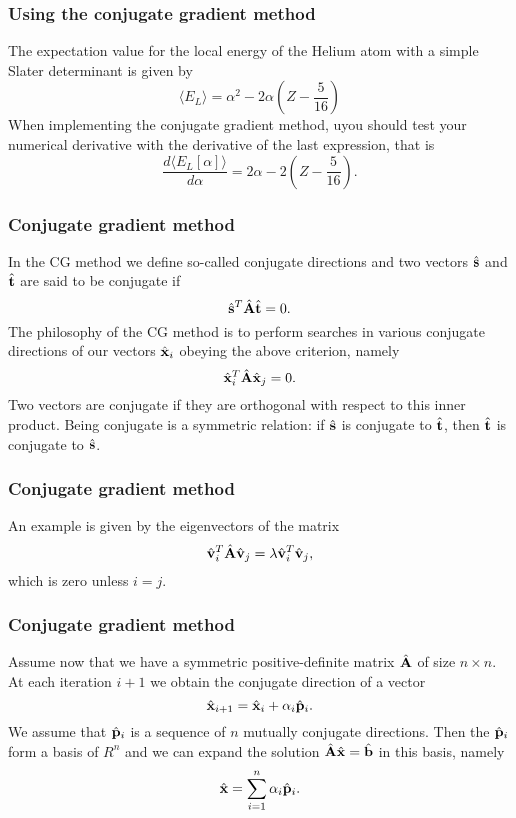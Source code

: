 \frame
{
  \frametitle{Using the conjugate gradient method}
\begin{small}
{\scriptsize
The expectation value for the local energy of the Helium atom with a simple Slater determinant is given by
\[
\langle E_{L} \rangle = \alpha^2-2\alpha\left(Z-\frac{5}{16}\right)
\]
When implementing the conjugate gradient method, uyou should test your numerical derivative with the derivative of the last expression, that is
\[
\frac{d\langle E_{L}[\alpha] \rangle}{d\alpha} = 2\alpha-2\left(Z-\frac{5}{16}\right).
\]
}
\end{small}
}

\frame
{
  \frametitle{Conjugate gradient method}
\begin{small}
{\scriptsize
In the CG method we define so-called conjugate directions and two vectors 
$\hat{\bf {s}}$ and $\hat{\bf {t}}$
are said to be
conjugate if 
\[
\hat{\bf {s}}^T\hat{{\bf A}}\hat{\bf {t}}= 0.
\]
The philosophy of the CG method is to perform searches in various conjugate directions
of our vectors $\hat{{\bf x}}_i$ obeying the above criterion, namely
\[
\hat{\bf {x}}_i^T\hat{{\bf A}}\hat{\bf {x}}_j= 0.
\]
Two vectors are conjugate if they are orthogonal with respect to 
this inner product. Being conjugate is a symmetric relation: if $\hat{\bf {s}}$ is conjugate to $\hat{\bf {t}}$, then $\hat{\bf {t}}$ is conjugate to $\hat{\bf {s}}$.
}
\end{small}
}


\frame
{
  \frametitle{Conjugate gradient method}
\begin{small}
{\scriptsize
An example is given by the eigenvectors of the matrix 
\[
\hat{\bf {v}}_i^T\hat{{\bf A}}\hat{\bf {v}}_j= \lambda\hat{\bf {v}}_i^T\hat{\bf {v}}_j,
\]
which is zero unless $i=j$. 

}
\end{small}
}


\frame
{
  \frametitle{Conjugate gradient method}
\begin{small}
{\scriptsize
Assume now that we have a symmetric positive-definite matrix $\hat{\bf {A}}$ of size
$n\times n$. At each iteration $i+1$ we obtain the conjugate direction of a vector 
\[
\hat{\bf {x}}_{i+1}=\hat{\bf {x}}_{i}+\alpha_i\hat{\bf {p}}_{i}. 
\]
We assume that $\hat{\bf {p}}_{i}$ is a sequence of $n$ mutually conjugate directions. 
Then the $\hat{\bf {p}}_{i}$  form a basis of $R^n$ and we can expand the solution 
$  \hat{{\bf A}}\hat{\bf {x}} = \hat{\bf {b}}$ in this basis, namely
\[
  \hat{\bf {x}}  = \sum^{n}_{i=1} \alpha_i \hat{\bf {p}}_i.
\]
}
\end{small}
}

